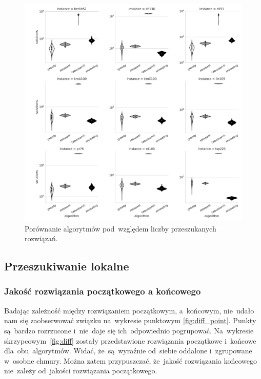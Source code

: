 \begin{figure}[H]
\begin{center}
\includegraphics[width=1.0\textwidth]{graphs/solutions_comparison_violin.pdf}
\end{center}
\caption{Porównanie algorytmów pod~względem liczby przeszukanych rozwiązań.}
\label{fig:nsol}
\end{figure}

\subsection{Przeszukiwanie lokalne}

\subsubsection{Jakość rozwiązania początkowego a końcowego}

Badając zależność między rozwiązaniem początkowym, a~końcowym, nie~udało nam się zaobserwować związku na~wykresie punktowym \ref{fig:diff_point}. Punkty są~bardzo rozrzucone i~nie~daje się ich~odpowiednio pogrupować. Na~wykresie skrzypcowym~\ref{fig:diff} zostały przedstawione rozwiązania początkowe i~końcowe dla~obu~algorytmów. Widać, że~są~wyraźnie od~siebie oddalone i~zgrupowane w~osobne chmury. Można zatem przypuszczać, że~jakość rozwiązania końcowego nie~zależy od~jakości rozwiązania początkowego.

